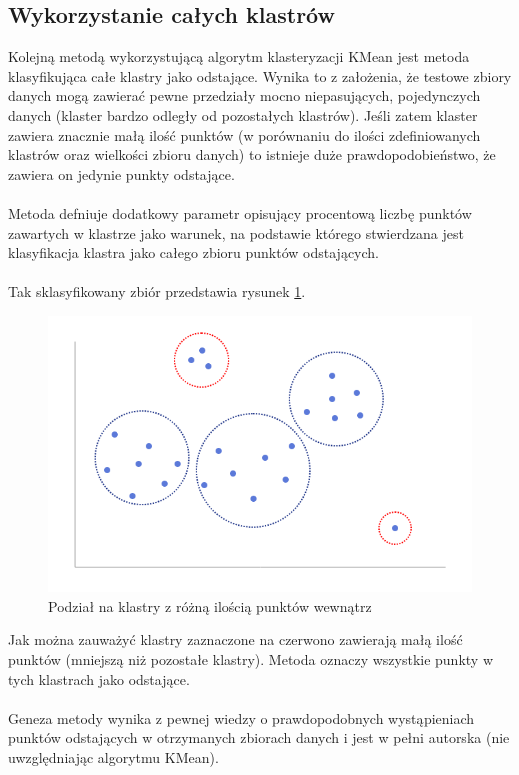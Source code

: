 \documentclass[eng,printmode]{mgr}
\begin{document}
\subsection{Wykorzystanie całych klastrów}
Kolejną metodą wykorzystującą algorytm klasteryzacji KMean jest metoda klasyfikująca całe klastry jako odstające. Wynika to z założenia, że testowe zbiory danych mogą zawierać pewne przedziały mocno niepasujących, pojedynczych danych (klaster bardzo odległy od pozostałych klastrów). Jeśli zatem klaster zawiera znacznie małą ilość punktów (w porównaniu do ilości zdefiniowanych klastrów oraz wielkości zbioru danych) to istnieje duże prawdopodobieństwo, że zawiera on jedynie punkty odstające. \\\\
Metoda defniuje dodatkowy parametr opisujący procentową liczbę punktów zawartych w klastrze jako warunek, na podstawie którego stwierdzana jest klasyfikacja klastra jako całego zbioru punktów odstających.
\\\\
Tak sklasyfikowany zbiór przedstawia rysunek \ref{fig:KMean_sim}.
\begin{figure}[H]
  \begin{center}
  \includegraphics[scale=0.7]{KMean_sim}
  \end{center}
  \caption{Podział na klastry z różną ilością punktów wewnątrz}
  \label{fig:KMean_sim}
\end{figure}
Jak można zauważyć klastry zaznaczone na czerwono zawierają małą ilość punktów (mniejszą niż pozostałe klastry). Metoda oznaczy wszystkie punkty w tych klastrach jako odstające.
\\\\
Geneza metody wynika z pewnej wiedzy o prawdopodobnych wystąpieniach punktów odstających w otrzymanych zbiorach danych i jest w pełni autorska (nie uwzględniając algorytmu KMean).
\end{document}
